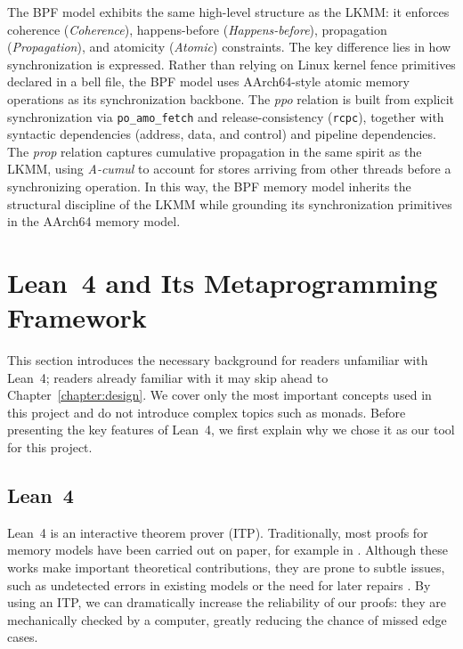 The BPF model exhibits the same high-level structure as the LKMM: it enforces coherence (\textit{Coherence}), happens-before (\textit{Happens-before}), propagation (\textit{Propagation}), and atomicity (\textit{Atomic}) constraints. The key difference lies in how synchronization is expressed. Rather than relying on Linux kernel fence primitives declared in a bell file, the BPF model uses AArch64-style atomic memory operations as its synchronization backbone. The \textit{ppo} relation is built from explicit synchronization via \texttt{po\_amo\_fetch} and release-consistency (\texttt{rcpc}), together with syntactic dependencies (address, data, and control) and pipeline dependencies. The \textit{prop} relation captures cumulative propagation in the same spirit as the LKMM, using \textit{A-cumul} to account for stores arriving from other threads before a synchronizing operation. In this way, the BPF memory model inherits the structural discipline of the LKMM while grounding its synchronization primitives in the AArch64 memory model.



\section{Lean~4 and Its Metaprogramming Framework}
This section introduces the necessary background for readers unfamiliar with Lean~4; readers already familiar with it may skip ahead to Chapter~\ref{chapter:design}. We cover only the most important concepts used in this project and do not introduce complex topics such as monads. Before presenting the key features of Lean~4, we first explain why we chose it as our tool for this project.

\subsection{Lean~4}

Lean~4 is an interactive theorem prover (ITP). Traditionally, most proofs for memory models have been carried out on paper, for example in \citep{podkopaev2019bridging, 10.1145/2627752, batty2011mathematizing, doko2016program}. Although these works make important theoretical contributions, they are prone to subtle issues, such as undetected errors in existing models \citep{chakraborty2016fixing, chakraborty2017grounding} or the need for later repairs \citep{10.1145/3140587.3062352Reparing}. By using an ITP, we can dramatically increase the reliability of our proofs: they are mechanically checked by a computer, greatly reducing the chance of missed edge cases.

